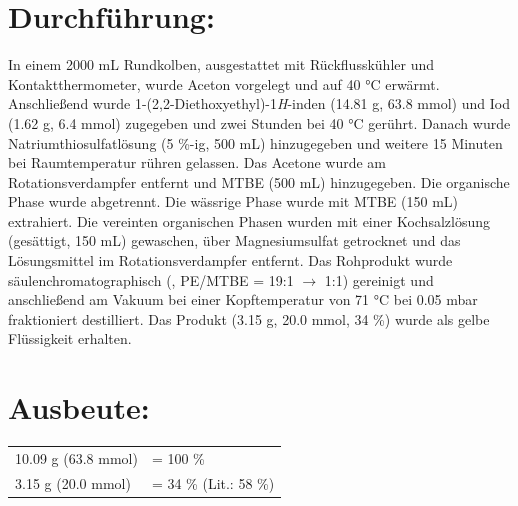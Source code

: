 \documentclass[12pt]{article}
\begin{document}
\begin{onehalfspace}
\section{Durchführung:\cite{vor}}
In einem 2000 \si{\milli\liter} Rundkolben, ausgestattet mit Rückflusskühler und Kontaktthermometer, wurde Aceton vorgelegt und auf 40 \si{\celsius} erwärmt. Anschließend wurde 1-(2,2-Diethoxyethyl)-1\textit{H}-inden (14.81 \si{\gram}, 63.8 \si{\milli\mol}) und Iod (1.62 \si{\gram}, 6.4 \si{\milli\mol}) zugegeben und zwei Stunden bei 40 \si{\celsius} gerührt. Danach wurde Natriumthiosulfatlösung (5 \%-ig, 500 \si{\milli\liter}) hinzugegeben und weitere 15 Minuten bei Raumtemperatur rühren gelassen. Das Acetone wurde am Rotationsverdampfer entfernt und MTBE (500 \si{\milli\liter}) hinzugegeben. Die organische Phase wurde abgetrennt. Die wässrige Phase wurde mit MTBE (150 \si{\milli\liter}) extrahiert. Die vereinten organischen Phasen wurden mit einer Kochsalzlösung (gesättigt, 150 \si{\milli\liter}) gewaschen, über Magnesiumsulfat getrocknet und das Lösungsmittel im Rotationsverdampfer entfernt. Das Rohprodukt wurde säulenchromatographisch (, PE/MTBE = 19:1 $\rightarrow$ 1:1) gereinigt und anschließend am Vakuum bei einer Kopftemperatur von 71 \si{\celsius} bei 0.05 \si{\milli\bar} fraktioniert destilliert. Das Produkt (3.15 \si{\gram}, 20.0 \si{\milli\mol}, 34 \%) wurde als gelbe Flüssigkeit erhalten.
\section{Ausbeute:}
\begin{tabular}{ ll}
  10.09 \si{\gram} (63.8 \si{\milli\mol})   & = 100 \%\\
  3.15 \si{\gram} (20.0 \si{\milli\mol})   & = 34 \% (Lit.:\cite{vor} 58 \%) \\
 \end{tabular}
\newpage 

\end{onehalfspace}
\end{document}
